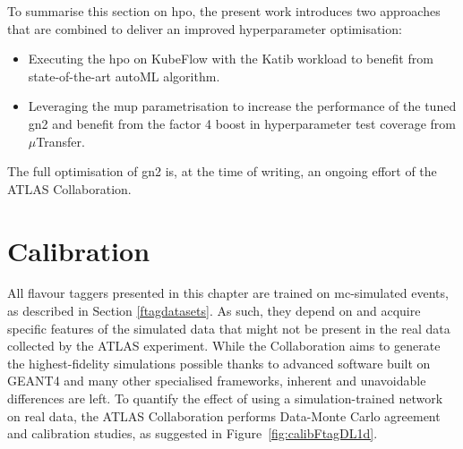To summarise this section on \gls{hpo}, the present work introduces two approaches that are combined to deliver an improved hyperparameter optimisation:
\begin{itemize}
  \item Executing the \gls{hpo} on KubeFlow with the Katib workload to benefit from state-of-the-art autoML algorithm.
  \item Leveraging the \gls{mup} parametrisation to increase the performance of the tuned \gls{gn2} and benefit from the factor 4 boost in hyperparameter test coverage from $\mu$Transfer.
\end{itemize}
The full optimisation of \gls{gn2} is, at the time of writing, an ongoing effort of the ATLAS Collaboration.

\section{Calibration}\label{chap-calibration}
All flavour taggers presented in this chapter are trained on \gls{mc}-simulated events, as described in Section \ref{ftagdatasets}. As such, they depend on and acquire specific features of the simulated data that might not be present in the real data collected by the ATLAS experiment. While the Collaboration aims to generate the highest-fidelity simulations possible thanks to advanced software built on GEANT4 \cite{Agostinelli:602040} and many other specialised frameworks, inherent and unavoidable differences are left. To quantify the effect of using a simulation-trained network on real data, the ATLAS Collaboration performs Data-Monte Carlo agreement and calibration studies, as suggested in Figure~\ref{fig:calibFtagDL1d}.

